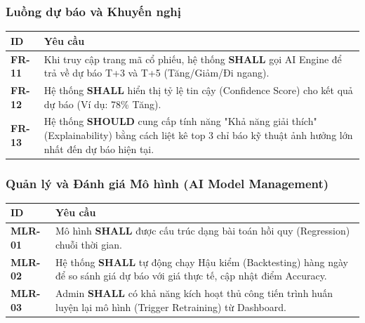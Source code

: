\documentclass[12pt, a4paper]{article}
\begin{document}
\subsubsection{Luồng dự báo và Khuyến nghị}

\begin{table}[H]
    \centering
    \renewcommand{\arraystretch}{1.3}

    \begin{tabularx}{\textwidth}{|l|X|}
        \hline
        \rowcolor{gray!10}
        \textbf{ID}    & \textbf{Yêu cầu}                                                                                                                                                    \\
        \hline
        \textbf{FR-11} & Khi truy cập trang mã cổ phiếu, hệ thống \textbf{SHALL} gọi AI Engine để trả về dự báo T+3 và T+5 (Tăng/Giảm/Đi ngang).                                             \\
        \hline
        \textbf{FR-12} & Hệ thống \textbf{SHALL} hiển thị tỷ lệ tin cậy (Confidence Score) cho kết quả dự báo (Ví dụ: 78\% Tăng).                                                            \\
        \hline
        \textbf{FR-13} & Hệ thống \textbf{SHOULD} cung cấp tính năng "Khả năng giải thích" (Explainability) bằng cách liệt kê top 3 chỉ báo kỹ thuật ảnh hưởng lớn nhất đến dự báo hiện tại. \\
        \hline
    \end{tabularx}

\end{table}

\subsubsection{Quản lý và Đánh giá Mô hình (AI Model Management)}

\begin{table}[H]
    \centering
    \renewcommand{\arraystretch}{1.3}

    \begin{tabularx}{\textwidth}{|l|X|}
        \hline
        \rowcolor{gray!10}
        \textbf{ID}     & \textbf{Yêu cầu}                                                                                                                     \\
        \hline
        \textbf{MLR-01} & Mô hình \textbf{SHALL} được cấu trúc dạng bài toán hồi quy (Regression) chuỗi thời gian.                                             \\
        \hline
        \textbf{MLR-02} & Hệ thống \textbf{SHALL} tự động chạy Hậu kiểm (Backtesting) hàng ngày để so sánh giá dự báo với giá thực tế, cập nhật điểm Accuracy. \\
        \hline
        \textbf{MLR-03} & Admin \textbf{SHALL} có khả năng kích hoạt thủ công tiến trình huấn luyện lại mô hình (Trigger Retraining) từ Dashboard.             \\
        \hline
    \end{tabularx}

\end{table}
\end{document}
